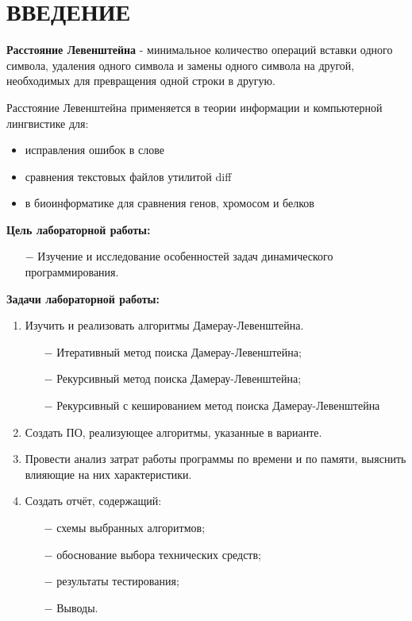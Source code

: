 \chapter*{ВВЕДЕНИЕ}


\textbf{Расстояние Левенштейна} - минимальное количество операций вставки одного символа,
удаления одного символа и замены одного символа на другой, необходимых для превращения одной строки в другую.
\newline

Расстояние Левенштейна применяется в теории информации и компьютерной лингвистике для:

\begin{itemize}
    \item исправления ошибок в слове
    \item сравнения текстовых файлов утилитой diff
    \item в биоинформатике для сравнения генов, хромосом и белков
\end{itemize}

\textbf{Цель лабораторной работы:}
\begin{itemize}
    \item[$-$] Изучение и исследование особенностей задач динамического программирования.
\end{itemize}

\textbf{Задачи лабораторной работы:}
\begin{enumerate}
\item Изучить и реализовать алгоритмы Дамерау-Левенштейна.
\begin{enumerate}
    \item[$-$] Итеративный метод поиска Дамерау-Левенштейна;
    \item[$-$] Рекурсивный метод поиска Дамерау-Левенштейна;
    \item[$-$] Рекурсивный с кешированием метод поиска Дамерау-Левенштейна
\end{enumerate}
\item Создать ПО, реализующее алгоритмы, указанные в варианте.
\item Провести анализ затрат работы программы по времени и по памяти, выяснить влияющие на них характеристики.
    \item Создать отчёт, содержащий:
    \begin{enumerate}
        \item[$-$] схемы выбранных алгоритмов;
        \item[$-$] обоснование выбора технических средств;
        \item[$-$] результаты тестирования;
        \item[$-$] Выводы.
    \end{enumerate}
\end{enumerate}

